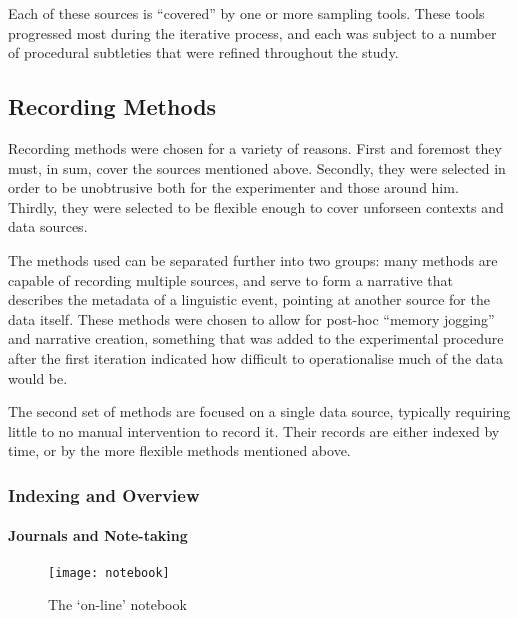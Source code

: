 Each of these sources is ``covered'' by one or more sampling tools.  These tools progressed most during the iterative process, and each was subject to a number of procedural subtleties that were refined throughout the study.












\subsection{Recording Methods}
Recording methods were chosen for a variety of reasons.  First and foremost they must, in sum, cover the sources mentioned above.  Secondly, they were selected in order to be unobtrusive both for the experimenter and those around him.  Thirdly, they were selected to be flexible enough to cover unforseen contexts and data sources.

The methods used can be separated further into two groups: many methods are capable of recording multiple sources, and serve to form a narrative that describes the metadata of a linguistic event, pointing at another source for the data itself.  These methods were chosen to allow for post-hoc ``memory jogging'' and narrative creation, something that was added to the experimental procedure after the first iteration indicated how difficult to operationalise much of the data would be.

The second set of methods are focused on a single data source, typically requiring little to no manual intervention to record it.  Their records are either indexed by time, or by the more flexible methods mentioned above.


\subsubsection{Indexing and Overview}
\paragraph{Journals and Note-taking}

\begin{figure}[p]
\centering
\texttt{[image: notebook]}
\caption{The `on-line' notebook}
\label{fig:personal:online_notebook}
\end{figure}

